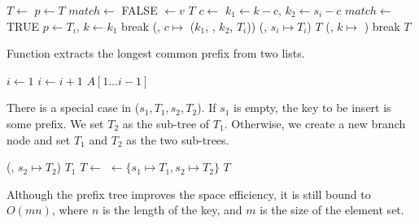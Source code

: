 \documentclass[b5paper]{article}
\begin{document}
\begin{algorithmic}[1]
   \State $T \gets$ 
  \EndIf
  \State $p \gets T$
  \Loop
    \State $match \gets$ FALSE
        \State {} $\gets v$ 
        \State \Return $T$
      \EndIf
      \State $c \gets$ 
      \State $k_1 \gets k - c$, $k_2 \gets s_i - c$
        \State $match \gets$ TRUE
         
          \State $p \gets T_i$, $k \gets k_1$
          \State break
        \Else {}
          \State {}(, $c \mapsto$ ($k_1$, , $k_2$, $T_i$))
          \State {}(, $s_i \mapsto T_i$)
          \State \Return $T$
        \EndIf
      \EndIf
    \EndFor
     
      \State {}(, $k \mapsto$ )
      \State break
    \EndIf
  \EndLoop
  \State \Return $T$
\EndFunction
\end{algorithmic}

Function  extracts the longest common prefix from two lists.

\begin{algorithmic}[1]
  \State $i \gets 1 $
    \State $i \gets i + 1$
  \EndWhile
  \State \Return $A[1...i-1]$
\EndFunction
\end{algorithmic}

There is a special case in ($s_1, T_1, s_2, T_2$). If $s_1$ is empty, the key to be insert is some prefix. We set $T_2$ as the sub-tree of $T_1$. Otherwise, we create a new branch node and set $T_1$ and $T_2$ as the two sub-trees.

\begin{algorithmic}[1]
    \State {}(, $s_2 \mapsto T_2$)
    \State \Return $T_1$
  \EndIf
  \State $T \gets$ 
  \State {} $\gets \{s_1 \mapsto T_1, s_2 \mapsto T_2\}$
  \State \Return $T$
\EndFunction
\end{algorithmic}

Although the prefix tree improves the space efficiency, it is still bound to $O(m n)$, where $n$ is the length of the key, and $m$ is the size of the element set.
\end{document}
